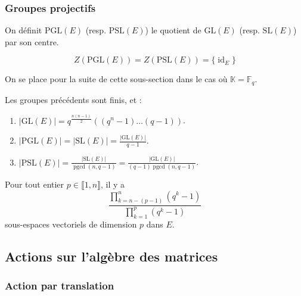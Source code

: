   \subsubsection{Groupes projectifs}


  \begin{definition}
    On définit $\mathrm{PGL}(E)$ (resp. $\mathrm{PSL}(E)$) le quotient de $\mathrm{GL}(E)$ (resp. $\mathrm{SL}(E)$) par son centre.
  \end{definition}

  \begin{proposition}
    \[ Z(\mathrm{PGL}(E)) = Z(\mathrm{PSL}(E)) = \{ \operatorname{id}_E \} \]
  \end{proposition}


  On se place pour la suite de cette sous-section dans le cas où $\mathbb{K} = \mathbb{F}_q$.

  \begin{proposition}
    Les groupes précédents sont finis, et :
    \begin{enumerate}[label={\bfseries(\roman*)}]
      \item $|\mathrm{GL}(E)| = q^{\frac{n(n-1)}{2}}((q^n-1) \dots (q-1))$.
      \item $|\mathrm{PGL}(E)| = |\mathrm{SL}(E)| = \frac{|\mathrm{GL}(E)|}{q-1}$.
      \item $|\mathrm{PSL}(E)| = \frac{|\mathrm{SL}(E)|}{\operatorname{pgcd}(n,q-1)} = \frac{|\mathrm{GL}(E)|}{(q-1)\operatorname{pgcd}(n,q-1)}$.
    \end{enumerate}
  \end{proposition}


  \begin{application}
    Pour tout entier $p \in \llbracket 1, n \rrbracket$, il y a
    \[ \frac{\prod_{k=n-(p-1)}^{n} (q^k - 1)}{\prod_{k=1}^{p} (q^k - 1)} \]
    sous-espaces vectoriels de dimension $p$ dans $E$.
  \end{application}

  \subsection{Actions sur l'algèbre des matrices}

  \subsubsection{Action par translation}

